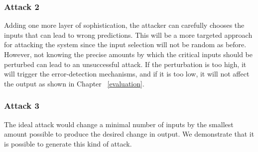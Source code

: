 \subsubsection{Attack 2}
Adding one more layer of sophistication, the attacker can carefully chooses the inputs that can lead to wrong predictions. 
 This will be a more targeted approach for attacking the system since the input selection will not be random as before. 
However, not knowing the precise amounts by which the critical inputs should be perturbed can lead to an unsuccessful attack. 
If the perturbation is too high, it will trigger the error-detection mechanisms, 
and if it is too low, it will not affect the output as shown in Chapter ~\ref{evaluation}. 

\subsubsection{Attack 3}
The ideal attack would change a minimal number of inputs by the smallest amount possible to produce the desired change in output. 
We demonstrate that it is possible to generate this kind of attack.
 
















